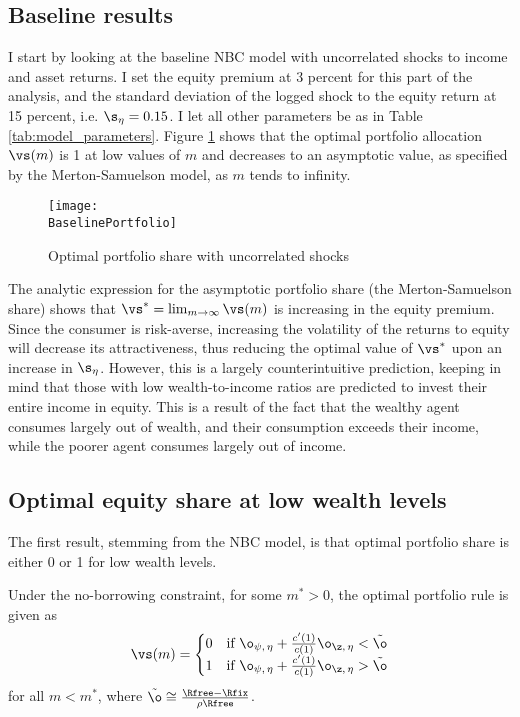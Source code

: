 \subsection{Baseline results}

I start by looking at the baseline NBC model with uncorrelated shocks to income and asset returns. I set the equity premium at 3 percent for this part of the analysis, and the standard deviation of the logged shock to the equity return at 15 percent, i.e. $\s_{\eta} = 0.15$. I let all other parameters be as in Table \ref{tab:model_parameters}. Figure \ref{fig:baseline_portfolio} shows that the optimal portfolio allocation $\vs(m)$ is 1 at low values of $m$ and decreases to an asymptotic value, as specified by the Merton-Samuelson model, as $m$ tends to infinity.

\begin{figure}[h]
    \centering
    \texttt{[image: \\BaselinePortfolio]}
    \caption{Optimal portfolio share with uncorrelated shocks}
    \label{fig:baseline_portfolio}
\end{figure}

The analytic expression for the asymptotic portfolio share (the Merton-Samuelson share) shows that $\vs^* = \lim_{m\to\infty}\vs(m)$ is increasing in the equity premium. Since the consumer is risk-averse, increasing the volatility of the returns to equity will decrease its attractiveness, thus reducing the optimal value of $\vs^*$ upon an increase in $\s_{\eta}$. However, this is a largely counterintuitive prediction, keeping in mind that those with low wealth-to-income ratios are predicted to invest their entire income in equity. This is a result of the fact that the wealthy agent consumes largely out of wealth, and their consumption exceeds their income, while the poorer agent consumes largely out of income.

\subsection{Optimal equity share at low wealth levels}

The first result, stemming from the NBC model, is that optimal portfolio share is either 0 or 1 for low wealth levels.

\begin{prop}\label{prop:low_wealth_share}
    Under the no-borrowing constraint, for some $m^* > 0$, the optimal portfolio rule is given as
    \[
        \vs(m) = \begin{cases}
            0 & \text{if } \o_{\psi,\,\eta} + \frac{c'(1)}{c(1)}\o_{\z,\,\eta} < \tilde{\o}\\
            1 & \text{if } \o_{\psi,\,\eta} + \frac{c'(1)}{c(1)}\o_{\z,\,\eta} > \tilde{\o}
        \end{cases}
    \]
    for all $m < m^*$, where $\tilde{\o} \cong \frac{\Rfree - \Rfix}{\rho\Rfree}$.
\end{prop}

